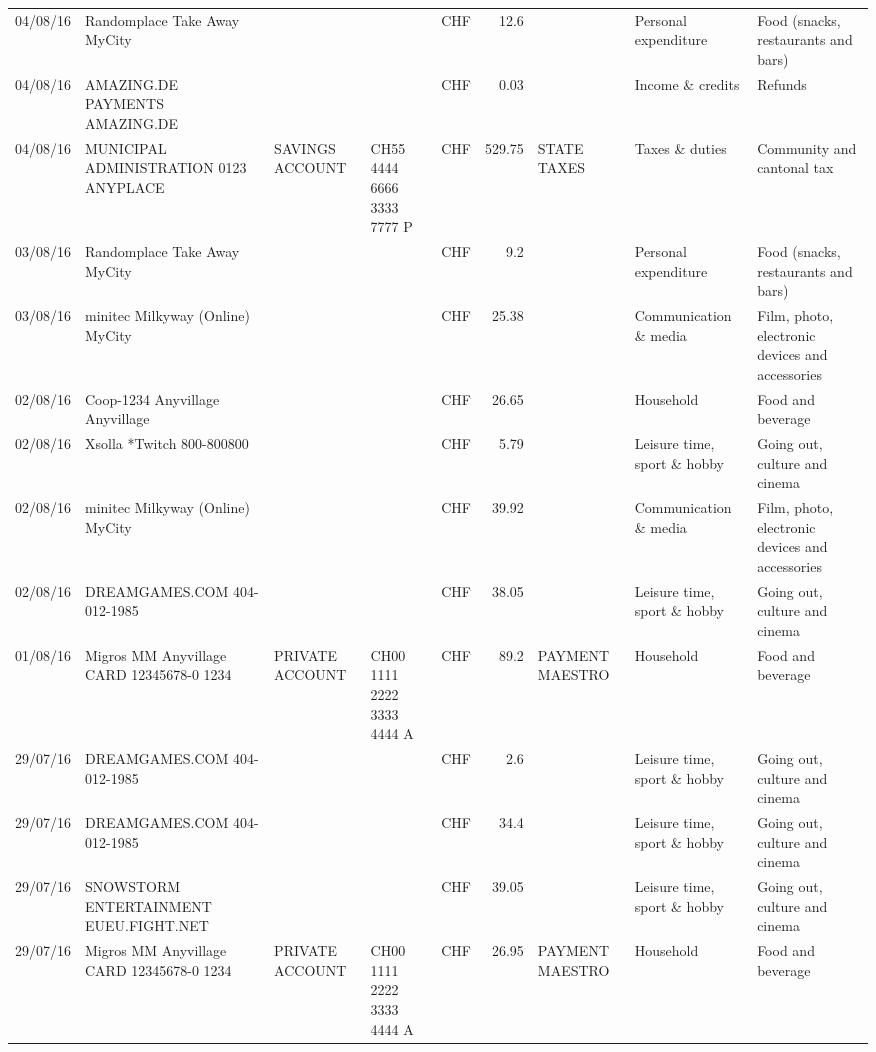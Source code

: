 \begin{landscape}
\begin{table}[h]
\begin{center}
\begin{tabular}{rllllrlll}
		04/08/16 & Randomplace Take Away     MyCity &       &       & CHF   & 12.6  &       & Personal expenditure & Food (snacks, restaurants and bars) \\
		04/08/16 & AMAZING.DE PAYMENTS       AMAZING.DE &       &       & CHF   & 0.03  &       & Income \& credits & Refunds \\
		04/08/16 & MUNICIPAL ADMINISTRATION 0123 ANYPLACE & SAVINGS ACCOUNT & CH55 4444 6666 3333 7777 P & CHF   & 529.75 & STATE TAXES & Taxes \& duties & Community and cantonal tax \\
		03/08/16 & Randomplace Take Away     MyCity &       &       & CHF   & 9.2   &       & Personal expenditure & Food (snacks, restaurants and bars) \\
		03/08/16 & minitec Milkyway (Online) MyCity &       &       & CHF   & 25.38 &       & Communication \& media & Film, photo, electronic devices and accessories \\
		02/08/16 & Coop-1234 Anyvillage    Anyvillage &       &       & CHF   & 26.65 &       & Household & Food and beverage \\
		02/08/16 & Xsolla *Twitch           800-800800 &       &       & CHF   & 5.79  &       & Leisure time, sport \& hobby & Going out, culture and cinema \\
		02/08/16 & minitec Milkyway (Online) MyCity &       &       & CHF   & 39.92 &       & Communication \& media & Film, photo, electronic devices and accessories \\
		02/08/16 & DREAMGAMES.COM           404-012-1985 &       &       & CHF   & 38.05 &       & Leisure time, sport \& hobby & Going out, culture and cinema \\
		01/08/16 & Migros MM Anyvillage CARD 12345678-0 1234 & PRIVATE ACCOUNT & CH00 1111 2222 3333 4444 A & CHF   & 89.2  & PAYMENT MAESTRO & Household & Food and beverage \\
		29/07/16 & DREAMGAMES.COM           404-012-1985 &       &       & CHF   & 2.6   &       & Leisure time, sport \& hobby & Going out, culture and cinema \\
		29/07/16 & DREAMGAMES.COM           404-012-1985 &       &       & CHF   & 34.4  &       & Leisure time, sport \& hobby & Going out, culture and cinema \\
		29/07/16 & SNOWSTORM ENTERTAINMENT EUEU.FIGHT.NET &       &       & CHF   & 39.05 &       & Leisure time, sport \& hobby & Going out, culture and cinema \\
		29/07/16 & Migros MM Anyvillage CARD 12345678-0 1234 & PRIVATE ACCOUNT & CH00 1111 2222 3333 4444 A & CHF   & 26.95 & PAYMENT MAESTRO & Household & Food and beverage \\

\end{tabular}
\end{center}
\end{table}
\end{landscape}
